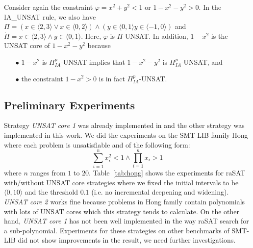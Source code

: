 \begin{example}
Consider again the constraint $\varphi = x^2 + y^2 < 1$ or $1 - x^2 - y^2 > 0$. In the \tiny IA\_UNSAT \normalsize rule, we also have $\Pi = (x \in \langle 2, 3 \rangle \vee x \in \langle 0, 2 \rangle) \wedge (y \in \langle 0, 1 \rangle y \in \langle -1, 0 \rangle)$ and $\mathring\Pi = x \in \langle 2, 3 \rangle \wedge y \in \langle 0, 1 \rangle$. Here, $\varphi$ is $\Pi$-UNSAT. In addition, $1 - x^2$ is the UNSAT core of $1 - x^2 - y^2$ because 
\begin{itemize}
\item[$\bullet$] $1 - x^2$ is $\Pi^p_{IA}$-UNSAT implies that $1 - x^2 - y^2$ is $\Pi^p_{IA}$-UNSAT, and 
\item[$\bullet$] the constraint $1 - x^2 > 0$ is in fact $\Pi^p_{IA}$-UNSAT.
\end{itemize} 
\end{example}

\subsection*{Preliminary Experiments}
Strategy \emph{UNSAT core 1} was already implemented in \cite{VanKhanh201227} and the other strategy was implemented in this work. We did the experiments on the SMT-LIB family Hong where each problem is unsatisfiable and of the following form:
\[\sum_{i=1}^{n}x_i^2 < 1 \wedge \prod_{i=1}^{n}x_i > 1\]
where $n$ ranges from $1$ to $20$. Table~\ref{tab:hong} shows the experiments for raSAT with/without UNSAT core strategies where we fixed the initial intervals to be $\langle 0, 10 \rangle$ and the threshold $0.1$ (i.e. no incremental deepening and widening). \emph{UNSAT core 2} works fine because problems in Hong family contain polynomials with lots of UNSAT cores which this strategy tends to calculate. On the other hand, \emph{UNSAT core 1} has not been well implemented in the way raSAT search for a sub-polynomial. Experiments for these strategies on other benchmarks of SMT-LIB did not show improvements in the result, we need further investigations.

